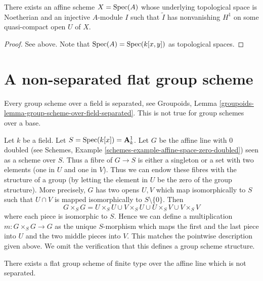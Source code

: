 \begin{lemma}
\label{lemma-nonvanishing}
There exists an affine scheme $X = \mathop{\mathrm{Spec}}(A)$ whose underlying
topological space is Noetherian and an injective
$A$-module $I$ such that $\widetilde{I}$ has nonvanishing $H^1$
on some quasi-compact open $U$ of $X$.
\end{lemma}

\begin{proof}
See above. Note that $\mathop{\mathrm{Spec}}(A) = \mathop{\mathrm{Spec}}(k[x, y])$ as topological spaces.
\end{proof}









\section{A non-separated flat group scheme}
\label{section-non-separated-group-scheme}

\noindent
Every group scheme over a field is separated, see
Groupoids, Lemma \ref{groupoids-lemma-group-scheme-over-field-separated}.
This is not true for group schemes over a base.

\medskip\noindent
Let $k$ be a field. Let $S = \mathop{\mathrm{Spec}}(k[x]) = \mathbf{A}^1_k$.
Let $G$ be the affine line with $0$ doubled (see
Schemes, Example \ref{schemes-example-affine-space-zero-doubled})
seen as a scheme over $S$. Thus a fibre of $G \to S$ is either a
singleton or a set with two elements (one in $U$ and one in $V$).
Thus we can endow these fibres with the structure of a group (by
letting the element in $U$ be the zero of the group structure).
More precisely, $G$ has two opens $U, V$ which map isomorphically
to $S$ such that $U \cap V$ is mapped isomorphically to
$S \setminus \{0\}$. Then
$$
G \times_S G = U \times_S U \cup V \times_S U \cup
U \times_S V \cup V \times_S V
$$
where each piece is isomorphic to $S$. Hence we can define a multiplication
$m : G \times_S G \to G$ as the unique $S$-morphism which maps the first
and the last piece into $U$ and the two middle pieces into $V$. This matches
the pointwise description given above. We omit the
verification that this defines a group scheme structure.

\begin{lemma}
\label{lemma-non-separated-group-scheme}
There exists a flat group scheme of finite type over the affine line
which is not separated.
\end{lemma}

